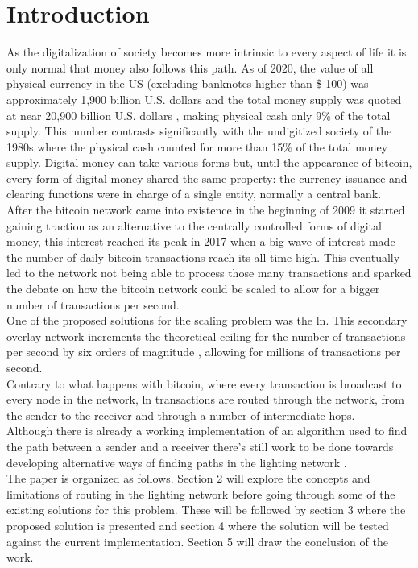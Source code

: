 \section{Introduction}

As the digitalization of society becomes more intrinsic to every aspect of life it is only normal that money also follows this path. As of 2020, the value of all physical currency in the US (excluding banknotes higher than \$ 100) was approximately 1,900 billion U.S. dollars \cite{currcir} and the total money supply was quoted at near 20,900 billion U.S. dollars \cite{mzm}, making physical cash only 9\% of the total supply. This number contrasts significantly with the undigitized society of the 1980s where the physical cash counted for more than 15\% of the total money supply.
Digital money can take various forms but, until the appearance of bitcoin, every form of digital money shared the same property: the currency-issuance and clearing functions were in charge of a single entity, normally a central bank. \\
After the bitcoin network came into existence in the beginning of 2009 \cite{bitcoin} it started gaining traction as an alternative to the centrally controlled forms of digital money, this interest reached its peak in 2017 when a big wave of interest made the number of daily bitcoin transactions reach its all-time high. This eventually led to the network not being able to process those many transactions and sparked the debate on how the bitcoin network could be scaled to allow for a bigger number of transactions per second. \\
One of the proposed solutions for the scaling problem was the \acrfull{ln}. This secondary overlay network increments the theoretical ceiling for the number of transactions per second by six orders of magnitude \cite{lightning_network}, allowing for millions of transactions per second.\\
Contrary to what happens with bitcoin, where every transaction is broadcast to every node in the network, \acrshort{ln} transactions are routed through the network, from the sender to the receiver and through a number of intermediate hops.\\
Although there is already a working implementation of an algorithm used to find the path between a sender and a receiver there's still work to be done towards developing alternative ways of finding paths in the lighting network \cite{trampoline_routing, ant_routing, flare}.\\
The paper is organized as follows. Section 2 will explore the concepts and limitations of routing in the lighting network before going through some of the existing solutions for this problem. These will be followed by section 3 where the proposed solution is presented and section 4 where the solution will be tested against the current implementation. Section 5 will draw the conclusion of the work.
